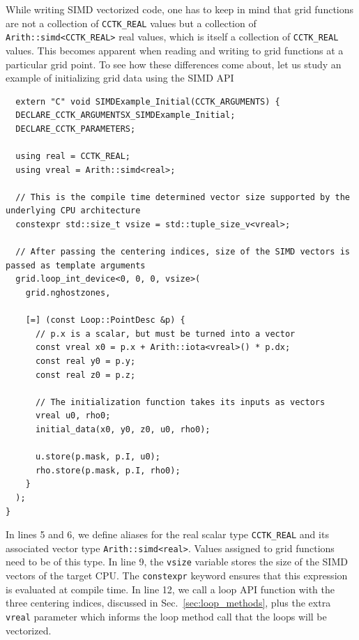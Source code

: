While writing SIMD vectorized code, one has to keep in mind that grid functions are not a collection of \texttt{CCTK\_REAL} values but a collection of \texttt{Arith::simd<CCTK\_REAL>} real values, which is itself a collection of \texttt{CCTK\_REAL} values. This becomes apparent when reading and writing to grid functions at a particular grid point. To see how these differences come about, let us study an example of initializing grid data using the SIMD API
%
\begin{lstlisting}
  extern "C" void SIMDExample_Initial(CCTK_ARGUMENTS) {
  DECLARE_CCTK_ARGUMENTSX_SIMDExample_Initial;
  DECLARE_CCTK_PARAMETERS;

  using real = CCTK_REAL;
  using vreal = Arith::simd<real>;
  
  // This is the compile time determined vector size supported by the underlying CPU architecture
  constexpr std::size_t vsize = std::tuple_size_v<vreal>;

  // After passing the centering indices, size of the SIMD vectors is passed as template arguments
  grid.loop_int_device<0, 0, 0, vsize>(
    grid.nghostzones,
    
    [=] (const Loop::PointDesc &p) {
      // p.x is a scalar, but must be turned into a vector
      const vreal x0 = p.x + Arith::iota<vreal>() * p.dx;
      const real y0 = p.y;
      const real z0 = p.z;
      
      // The initialization function takes its inputs as vectors
      vreal u0, rho0;
      initial_data(x0, y0, z0, u0, rho0);
      
      u.store(p.mask, p.I, u0);
      rho.store(p.mask, p.I, rho0);
    }
  );
}
\end{lstlisting}

In lines 5 and 6, we define aliases for the real scalar type \texttt{CCTK\_REAL} and its associated vector type \texttt{Arith::simd<real>}. Values assigned to grid functions need to be of this type. In line 9, the \texttt{vsize} variable stores the size of the SIMD vectors of the target CPU. The \texttt{constexpr} keyword ensures that this expression is evaluated at compile time. In line 12, we call a loop API function with the three centering indices, discussed in Sec.~\ref{sec:loop_methods}, plus the extra \texttt{vreal} parameter which informs the loop method call that the loops will be vectorized.

